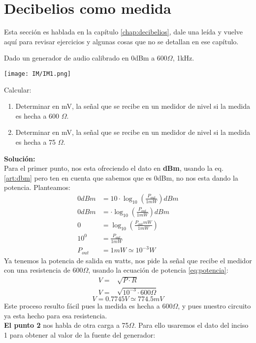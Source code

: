 \documentclass[
	11pt, %
	fleqn, %
	a4paper, %
]{LegrandOrangeBook}
\begin{document}
\section{Decibelios como medida}
Esta sección es hablada en la capítulo \ref{chap:decibelios}, dale una leída y vuelve aquí para revisar ejercicios y algunas cosas que no se detallan en ese capítulo.
\begin{example}
\label{exa:01}
Dado un generador de audio calibrado en 0dBm a 600$\Omega$, 1kHz.
\begin{center}
\texttt{[image: IM/IM1.png]}
\end{center}
Calcular:\\
\begin{enumerate}
\item Determinar en mV, la señal que se recibe en un medidor de nivel si la
medida es hecha a 600 $\Omega$.
\item Determinar en mV, la señal que se recibe en un medidor de nivel si la
medida es hecha a 75 $\Omega$.
\end{enumerate}
\textbf{Solución:}\\
Para el primer punto, nos esta ofreciendo el dato en \textbf{dBm}, usando la eq. \ref{art:dbm} pero ten en cuenta que sabemos que es 0dBm, no nos esta dando la potencia. Planteamos:
\begin{align*}
0dBm&=10\cdot\log_{10}\left(\frac{P_{out}}{1mW}\right)dBm\\
0dBm&=\cdot\log_{10}\left(\frac{P_{out}}{1mW}\right)dBm\\
0&=\log_{10}\left(\frac{P_{out}mW}{1mW}\right)\\
10^0&=\frac{P_{out}}{1mW}\\
P_{out}&=1mW\simeq 10^{-3}W
\end{align*}
Ya tenemos la potencia de salida en watts, nos pide la señal que recibe el medidor con una resistencia de 600$\Omega$, usando la ecuación de potencia \ref{eq:potencia}:
\begin{align*}
V=&\sqrt{P\cdot R}\\
V=&\sqrt{10^{-3}\cdot 600\Omega}
\end{align*}
\begin{equation*}
\boxed{V=0.7745V\simeq 774.5mV}
\end{equation*}
Este proceso resulto fácil pues la medida es hecha a 600$\Omega$, y pues nuestro circuito ya esta hecho para esa resistencia.\\
\textbf{El punto 2} nos habla de otra carga a 75$\Omega$. Para ello usaremos el dato del inciso 1 para obtener al valor de la fuente del generador:

\end{example}
\end{document}
